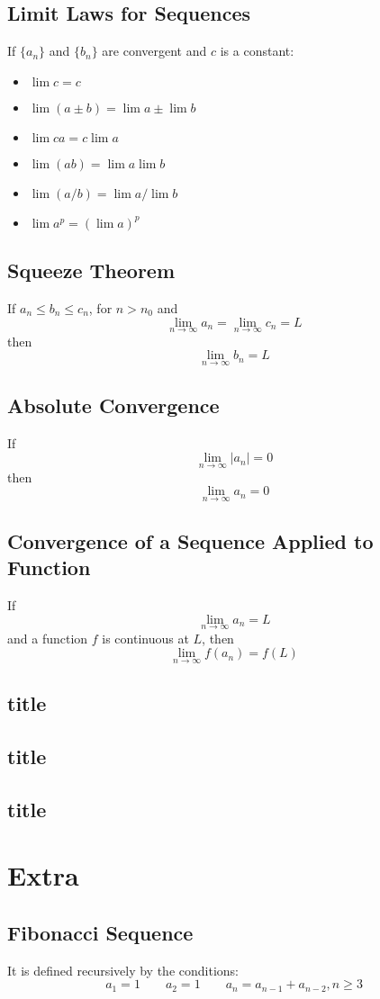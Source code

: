 \documentclass[10pt,a4paper,oneside]{article}
\begin{document}
\subsection{Limit Laws for Sequences}
If $\{a_n\}$ and $\{b_n\}$ are convergent and $c$ is a constant:
\begin{itemize}
	\item $\lim c = c$
	\item $\lim (a \pm b) = \lim a \pm \lim b$
	\item $\lim ca = c \lim a$
	\item $\lim (ab) = \lim a \lim b$
	\item $\lim (a/b) = \lim a / \lim b$
	\item $\lim a^p = (\lim a)^p$
\end{itemize}

\subsection{Squeeze Theorem}
If $a_n \leq b_n \leq c_n$, for $n>n_0$ and
\[
\lim_{n \rightarrow \infty} a_n = \lim_{n \rightarrow \infty} c_n = L 
\]
then
\[
\lim_{n \rightarrow \infty} b_n = L
\]

\subsection{Absolute Convergence}
If
\[
\lim_{n \rightarrow \infty} |a_n| = 0
\]
then
\[
\lim_{n \rightarrow \infty} a_n = 0
\]

\subsection{Convergence of a Sequence Applied to Function}
If
\[
\lim_{n \rightarrow \infty} a_n = L
\]
and a function $f$ is continuous at $L$, then
\[
\lim_{n \rightarrow \infty} f(a_n) = f(L)
\]

\subsection{title}
\subsection{title}
\subsection{title}


\section{Extra}
\subsection{Fibonacci Sequence}
It is defined recursively by the conditions:
\[
a_1 = 1 \qquad a_2 =1 \qquad a_n = a_{n-1} + a_{n-2}, n\geq3
\]
\end{document}
